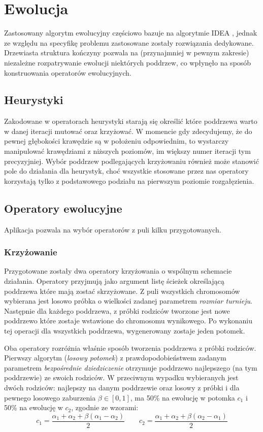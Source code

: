 \documentclass[11pt, leqno]{article}
\renewcommand{\i}[1]{\textit{#1}}
\begin{document}
\section{Ewolucja}
Zastosowany algorytm ewolucyjny częściowo bazuje na algorytmie IDEA \cite{PFI}, jednak ze względu na specyfikę problemu zastosowane zostały rozwiązania dedykowane. Drzewiasta struktura kończyny pozwala na (przynajmniej w pewnym zakresie) niezależne rozpatrywanie ewolucji niektórych poddrzew, co wpłynęło na sposób konstruowania operatorów ewolucyjnych.

\subsection{Heurystyki}
Zakodowane w operatorach heurystyki starają się określić które poddrzewa warto w danej iteracji mutować oraz krzyżować. W momencie gdy zdecydujemy, że do pewnej głębokości krawędzie są w położeniu odpowiednim, to wystarczy manipulować krawędziami z niższych poziomów, im większy numer iteracji tym precyzyjniej. Wybór poddrzew podlegających krzyżowaniu również może stanowić pole do działania dla heurystyk, choć wszystkie stosowane przez nas operatory korzystają tylko z podstawowego podziału na pierwszym poziomie rozgałęzienia.

\subsection{Operatory ewolucyjne}
Aplikacja pozwala na wybór operatorów z puli kilku przygotowanych.

\subsubsection{Krzyżowanie}
Przygotowane zostały dwa operatory krzyżowania o wspólnym schemacie działania. Operatory przyjmują jako argument listę ścieżek określającą poddrzewa które mają zostać skrzyżowane. Z puli wszystkich chromosomów wybierana jest losowo próbka o wielkości zadanej parametrem \i{rozmiar turnieju}. Następnie dla każdego poddrzewa, z próbki rodziców tworzone jest nowe poddrzewo które zostaje wstawione do chromosomu wynikowego. Po wykonaniu tej operacji dla wszystkich poddrzewa, wygenerowany zostaje jeden potomek.

Oba operatory rozróżnia właśnie sposób tworzenia poddrzewa z próbki rodziców. Pierwszy algorytm (\i{losowy potomek}) z prawdopodobieństwem zadanym parametrem \i{bezpośrednie dziedziczenie} otrzymuje poddrzewo najlepszego (na tym poddrzewie) ze swoich rodziców. W przeciwnym wypadku wybieranych jest dwóch rodziców: najlepszy na danym poddrzewie oraz losowy z próbki i dla pewnego losowego zaburzenia $\beta\in[0, 1]$, ma 50\% na ewolucję w potomka $c_1$ i 50\% na ewolucję w $c_2$, zgodnie ze wzorami:
	\[
		c_1 = \frac{\alpha_1 + \alpha_2 + \beta(\alpha_1 - \alpha_2)}{2} \quad\quad c_2 = \frac{\alpha_1 + \alpha_2 + \beta(\alpha_2 - \alpha_1)}{2}
	\]
\end{document}
